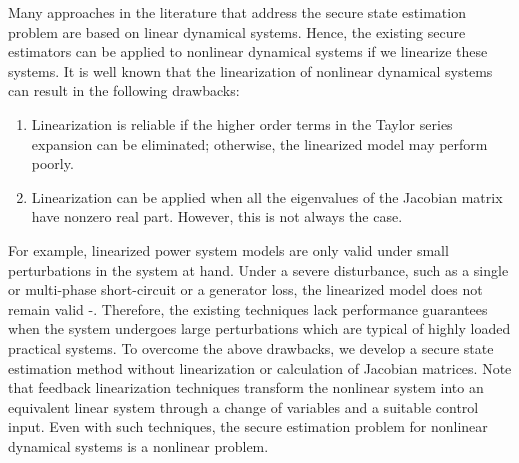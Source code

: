 \documentclass[../../thesis.tex]{subfiles}
\begin{document}
%



Many approaches in the literature that address the secure state estimation problem are based on linear dynamical systems. Hence, the existing secure estimators can be applied to nonlinear dynamical systems if we linearize these systems. It is well known that the linearization of nonlinear dynamical systems can result in the following drawbacks:
\begin{enumerate}
\item Linearization is reliable if the higher order terms in the Taylor series expansion can be eliminated; otherwise, the linearized model may perform poorly. %
\item Linearization can be applied when all the eigenvalues of the Jacobian matrix have nonzero real part. However, this is not always the case.
\end{enumerate}
For example, linearized power system models are only valid under small perturbations in the system at hand. Under a severe disturbance, such as a single or multi-phase short-circuit or a generator loss, the linearized model does not remain valid \cite{Kundur}-\!\!\cite{nonlin_est}. Therefore, the existing techniques lack performance guarantees when the system undergoes large perturbations which are typical of highly loaded practical systems. To overcome the above drawbacks, we develop a secure state estimation method without linearization or calculation of Jacobian matrices. Note that feedback linearization techniques transform the nonlinear system into an equivalent linear system through a change of variables and a suitable control input. Even with such techniques, the secure estimation problem for nonlinear dynamical systems is a nonlinear problem.
\end{document}
